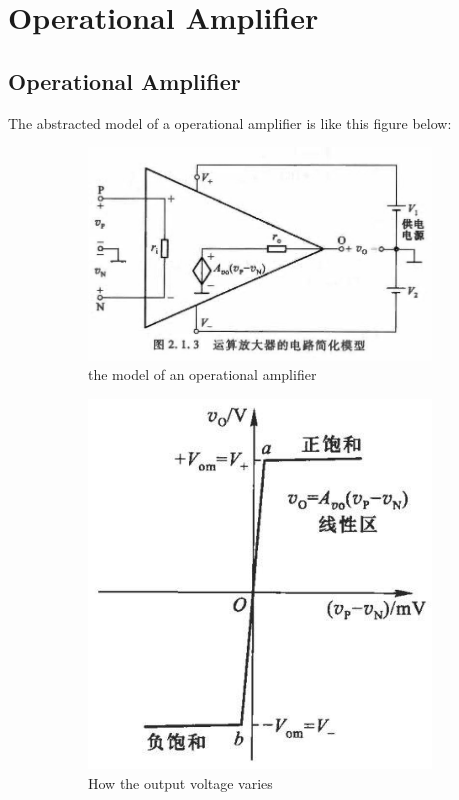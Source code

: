 
\chapter{Operational Amplifier}

\section{Operational Amplifier}

The abstracted model of a operational amplifier is like this figure below:

\begin{figure}[H]
  \centering
  \begin{subfigure}{.5\textwidth}
    \centering
    \includegraphics[width=\linewidth]{figures/comparator}
    \caption{the model of an operational amplifier}
    \label{fig:}
  \end{subfigure}%
  \begin{subfigure}{.5\textwidth}
    \centering
    \includegraphics[width=0.6\linewidth]{figures/comparator-voltage-change}
    \caption{How the output voltage varies}
    \label{fig:}
  \end{subfigure}
  \caption{}
  \label{fig:}
\end{figure}

